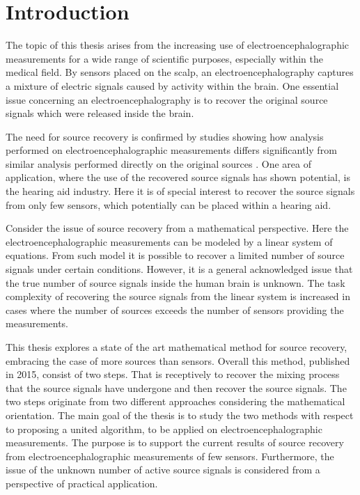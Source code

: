 \chapter*{Introduction}\label{ch:introduction}
The topic of this thesis arises from the increasing use of electroencephalographic measurements for a wide range of scientific purposes, especially within the medical field. 
By sensors placed on the scalp, an electroencephalography captures a mixture of electric signals caused by activity within the brain. 
One essential issue concerning an electroencephalography is to recover the original source signals which were released inside the brain. 

The need for source recovery is confirmed by studies showing how analysis performed on electroencephalographic measurements differs significantly from similar analysis performed directly on the original sources \cite{Friston2002}.
One area of application, where the use of the recovered source signals has shown potential, is the hearing aid industry. Here it is of special interest to recover the source signals from only few sensors, which potentially can be placed within a hearing aid. 

Consider the issue of source recovery from a mathematical perspective. Here the electroencephalographic measurements can be modeled by a linear system of equations. From such model it is possible to recover a limited number of source signals under certain conditions. However, it is a general acknowledged issue that the true number of source signals inside the human brain is unknown.
The task complexity of recovering the source signals from the linear system is increased in cases where the number of sources exceeds the number of sensors providing the measurements.

This thesis explores a state of the art mathematical method for source recovery, embracing the case of more sources than sensors. 
Overall this method, published in 2015, consist of two steps. That is receptively to recover the mixing process that the source signals have undergone and then recover the source signals.
The two steps originate from two different approaches considering the mathematical orientation. 
The main goal of the thesis is to study the two methods with respect to proposing a united algorithm, to be applied on electroencephalographic measurements. The purpose is to support the current results of source recovery from electroencephalographic measurements of few sensors. Furthermore, the issue of the unknown number of active source signals is considered from a perspective of practical application. 

